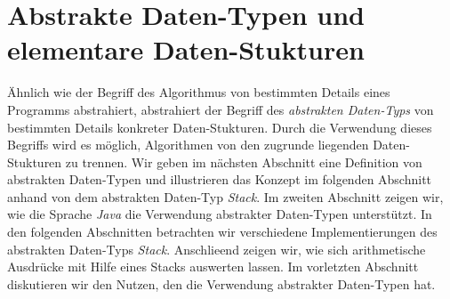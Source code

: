 \chapter{Abstrakte Daten-Typen und elementare Daten-Stukturen}
Ähnlich wie der Begriff des Algorithmus von bestimmten Details eines Programms
abstrahiert, abstrahiert der Begriff des \emph{abstrakten Daten-Typs} von bestimmten
Details konkreter Daten-Stukturen.  Durch die Verwendung dieses Begriffs wird es
m\"oglich, Algorithmen von den zugrunde liegenden Daten-Stukturen zu trennen.
Wir geben im n\"achsten Abschnitt eine Definition von abstrakten Daten-Typen und
illustrieren das Konzept im folgenden Abschnitt anhand von dem abstrakten Daten-Typ \textsl{Stack}.
Im zweiten Abschnitt zeigen wir, wie die Sprache \textsl{Java} die
Verwendung abstrakter Daten-Typen unterst\"utzt.  In den folgenden Abschnitten betrachten
wir verschiedene Implementierungen des abstrakten Daten-Typs \textsl{Stack}.
Anschlie\3end zeigen wir, wie sich arithmetische Ausdr\"ucke mit Hilfe eines Stacks
auswerten lassen.
Im vorletzten Abschnitt diskutieren wir den Nutzen, den die Verwendung abstrakter
Daten-Typen hat. 

